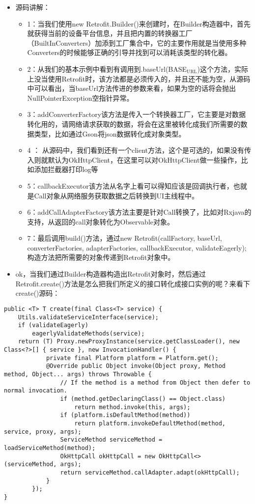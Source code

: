 \documentclass[9pt, b5paper]{article}
\begin{document}
\begin{itemize}
\item 源码讲解：
\begin{itemize}
\item 1：当我们使用new Retrofit.Builder()来创建时，在Builder构造器中，首先就获得当前的设备平台信息，并且把内置的转换器工厂（BuiltInConverters）加添到工厂集合中，它的主要作用就是当使用多种Converters的时候能够正确的引导并找到可以消耗该类型的转化器。
\item 2：从我们的基本示例中看到有调用到.baseUrl(BASE$_{\text{URL}}$)这个方法，实际上没当使用Retrofit时，该方法都是必须传入的，并且还不能为空，从源码中可以看出，当baseUrl方法传进的参数来看，如果为空的话将会抛出NullPointerException空指针异常。
\item 3：addConverterFactory该方法是传入一个转换器工厂，它主要是对数据转化用的，请网络请求获取的数据，将会在这里被转化成我们所需要的数据类型，比如通过Gson将json数据转化成对象类型。
\item 4 ： 从源码中，我们看到还有一个client方法，这个是可选的，如果没有传入则就默认为OkHttpClient，在这里可以对OkHttpClient做一些操作，比如添加拦截器打印log等
\item 5：callbackExecutor该方法从名字上看可以得知应该是回调执行者，也就是Call对象从网络服务获取数据之后转换到UI主线程中。
\item 6：addCallAdapterFactory该方法主要是针对Call转换了，比如对Rxjava的支持，从返回的call对象转化为Observable对象。
\item 7：最后调用build()方法，通过new Retrofit(callFactory, baseUrl, converterFactories, adapterFactories, callbackExecutor, validateEagerly);构造方法把所需要的对象传递到Retrofit对象中。
\end{itemize}
\item ok，当我们通过Builder构造器构造出Retrofit对象时，然后通过Retrofit.create()方法是怎么把我们所定义的接口转化成接口实例的呢？来看下create()源码：
\end{itemize}
\begin{verbatim}
public <T> T create(final Class<T> service) {
    Utils.validateServiceInterface(service);
    if (validateEagerly) 
        eagerlyValidateMethods(service);
    return (T) Proxy.newProxyInstance(service.getClassLoader(), new Class<?>[] { service }, new InvocationHandler() {
            private final Platform platform = Platform.get();
            @Override public Object invoke(Object proxy, Method method, Object... args) throws Throwable {
                // If the method is a method from Object then defer to normal invocation.
                if (method.getDeclaringClass() == Object.class) 
                    return method.invoke(this, args);
                if (platform.isDefaultMethod(method)) 
                    return platform.invokeDefaultMethod(method, service, proxy, args);
                ServiceMethod serviceMethod = loadServiceMethod(method);
                OkHttpCall okHttpCall = new OkHttpCall<>(serviceMethod, args);
                return serviceMethod.callAdapter.adapt(okHttpCall);
            }
        });
}
\end{verbatim}
\end{document}
